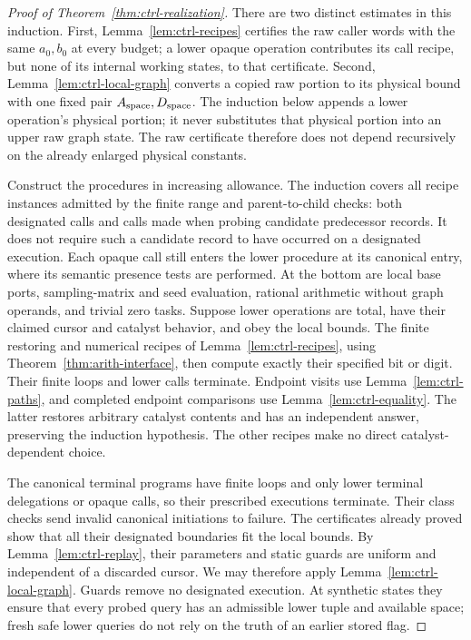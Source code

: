 \begin{proof}[Proof of Theorem~\ref{thm:ctrl-realization}]
There are two distinct estimates in this induction.  First,
Lemma~\ref{lem:ctrl-recipes} certifies the raw caller words with the same
$a_0,b_0$ at every budget; a lower opaque operation contributes its call
recipe, but none of its internal working states, to that certificate.
Second, Lemma~\ref{lem:ctrl-local-graph} converts a copied raw portion to
its physical bound with one fixed pair $A_{\rm space},D_{\rm space}$.  The induction below
appends a lower operation's physical portion; it never substitutes that
physical portion into an upper raw graph state.  The raw certificate
therefore does not depend recursively on the already enlarged physical
constants.

Construct the procedures in increasing allowance.  The induction covers
all recipe instances admitted by the finite range and parent-to-child
checks: both designated calls and calls made when probing candidate
predecessor records.  It does not require such a candidate record to
have occurred on a designated execution.  Each opaque call still enters
the lower procedure at its canonical entry, where its semantic presence
tests are performed.  At the bottom are
local base ports, sampling-matrix and seed evaluation, rational arithmetic without
graph operands, and trivial zero tasks.  Suppose lower operations are
total, have their claimed cursor and catalyst behavior, and obey the
local bounds.  The finite restoring and numerical recipes of
Lemma~\ref{lem:ctrl-recipes}, using
Theorem~\ref{thm:arith-interface}, then compute exactly their specified
bit or digit.  Their finite loops and lower calls terminate.  Endpoint
visits use Lemma~\ref{lem:ctrl-paths}, and completed endpoint comparisons
use Lemma~\ref{lem:ctrl-equality}.  The latter restores arbitrary
catalyst contents and has an independent answer, preserving the
induction hypothesis.  The other recipes make no direct
catalyst-dependent choice.

The canonical terminal programs have finite loops and only lower
terminal delegations or opaque calls, so their prescribed executions
terminate.  Their class checks send invalid canonical initiations to
failure.  The certificates already proved show that all their
designated boundaries fit the local bounds.  By
Lemma~\ref{lem:ctrl-replay}, their parameters and static guards are
uniform and independent of a discarded cursor.  We may therefore
apply Lemma~\ref{lem:ctrl-local-graph}.  Guards remove no designated
execution.  At synthetic states they ensure that every probed query
has an admissible lower tuple and available space; fresh safe lower
queries do not rely on the truth of an earlier stored flag.


\end{proof}
